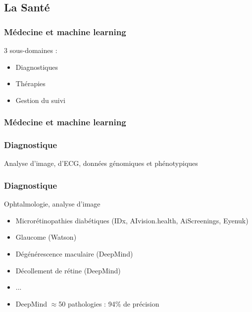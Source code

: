 \subsection{La Santé}

\begin{frame}
  \frametitle{Médecine et machine learning}
  3 sous-domaines :
  \begin{itemize}
  \item Diagnostiques
  \item Thérapies
  \item Gestion du suivi
  \end{itemize}
\end{frame}

\begin{frame}
  \frametitle{Médecine et machine learning}
\end{frame}

\begin{frame}
  \frametitle{Diagnostique}
  Analyse d'image, d'ECG, données génomiques et phénotypiques
\end{frame}

\begin{frame}
  \frametitle{Diagnostique}
  Ophtalmologie, analyse d'image
  \newline
  \newline
  \begin{minipage}[c]{0.65\linewidth}
    \begin{itemize}
    \item Microrétinopathies diabétiques (IDx, AIvision.health, AiScreenings, Eyenuk)
    \item Glaucome (Watson)
    \item Dégénérescence maculaire (DeepMind)
    \item Décollement de rétine (DeepMind)
    \item ...
    \item DeepMind $\approx$50 pathologies : 94\% de précision
    \end{itemize}
  \end{minipage}\hfill
  \begin{minipage}[c]{0.34\linewidth}
  \end{minipage}\hfill
\end{frame}

